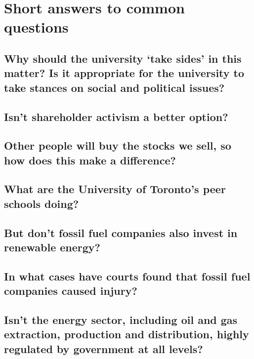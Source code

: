 


	\section{Short answers to common questions}



	\subsection{Why should the university `take sides' in this matter? Is it appropriate for the university to take stances on social and political issues?}
	


	\subsection{Isn't shareholder activism a better option?}
	
	
	
	\subsection{Other people will buy the stocks we sell, so how does this make a difference?}
	
	
	
	\subsection{What are the University of Toronto's peer schools doing?}
	
	
	
	\subsection{But don't fossil fuel companies also invest in renewable energy?}
	
	
	
	\subsection{In what cases have courts found that fossil fuel companies caused injury?}
	
	
	
	\subsection{Isn't the energy sector, including oil and gas extraction, production and distribution, highly regulated by government at all levels?}
	
